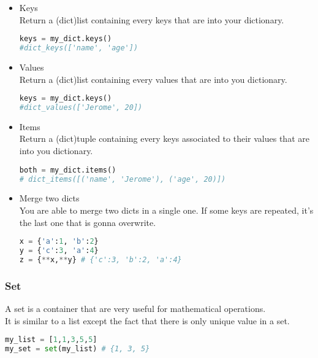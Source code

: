 \documentclass[a4paper, 12pt, titlepage]{scrartcl} %
\begin{document}
\begin{itemize}
\item Keys \\
Return a (dict)list containing every keys that are into your dictionary.
\begin{lstlisting}[language=Python]
keys = my_dict.keys()
#dict_keys(['name', 'age'])
\end{lstlisting} \vspace{5mm}

\item Values \\
Return a (dict)list containing every values that are into you dictionary.
\begin{lstlisting}[language=Python]
keys = my_dict.keys()
#dict_values(['Jerome', 20])
\end{lstlisting} \vspace{5mm}

\item Items \\
Return a (dict)tuple containing every keys associated to their values that are into you dictionary.
\begin{lstlisting}[language=Python]
both = my_dict.items()
# dict_items([('name', 'Jerome'), ('age', 20)])
\end{lstlisting} \vspace{5mm}

\item Merge two dicts \\
You are able to merge two dicts in a single one. If some keys are repeated, it's the last one that is gonna overwrite.
\begin{lstlisting}[language=Python]
x = {'a':1, 'b':2}
y = {'c':3, 'a':4}
z = {**x,**y} # {'c':3, 'b':2, 'a':4}
\end{lstlisting} \vspace{5mm}
\end{itemize}


\subsubsection{Set}
A set is a container that are very useful for mathematical operations.\\
It is similar to a list except the fact that there is only unique value in a set.
\begin{lstlisting}[language=Python]
my_list = [1,1,3,5,5]
my_set = set(my_list) # {1, 3, 5}
\end{lstlisting} \vspace{5mm}
\end{document}
